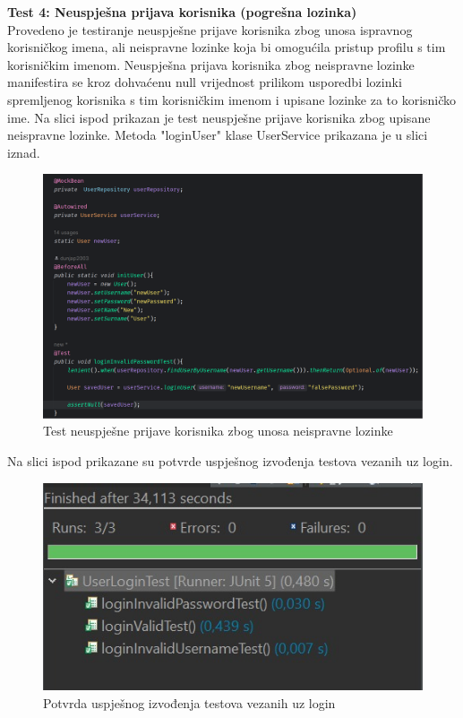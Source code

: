 \textbf{Test 4: Neuspješna prijava korisnika (pogrešna lozinka)} \\
Provedeno je testiranje neuspješne prijave korisnika zbog unosa ispravnog korisničkog imena, ali neispravne lozinke koja bi omogućila pristup profilu s tim korisničkim imenom. Neuspješna prijava korisnika zbog neispravne lozinke manifestira se kroz dohvaćenu null vrijednost prilikom usporedbi lozinki spremljenog korisnika s tim korisničkim imenom i upisane lozinke za to korisničko ime. Na slici ispod prikazan je test neuspješne prijave korisnika zbog upisane neispravne lozinke. Metoda "loginUser" klase UserService prikazana je u slici iznad.

				\begin{figure}[H]
			\includegraphics[scale=0.4]{slike/loginInvalidPasswordTest.PNG} %
			\centering
			\caption{Test neuspješne prijave korisnika zbog unosa neispravne lozinke}
			\label{Test neuspješne prijave korisnika zbog unosa neispravne lozinke}
		\end{figure}
		
		Na slici ispod prikazane su potvrde uspješnog izvođenja testova vezanih uz login.
		
			\begin{figure}[H]
			\includegraphics[scale=0.4]{slike/JUnit_login.JPG} %
			\centering
			\caption{Potvrda uspješnog izvođenja testova vezanih uz login}
			\label{Potvrda uspješnog izvođenja testova vezanih uz login}
		\end{figure}
			

